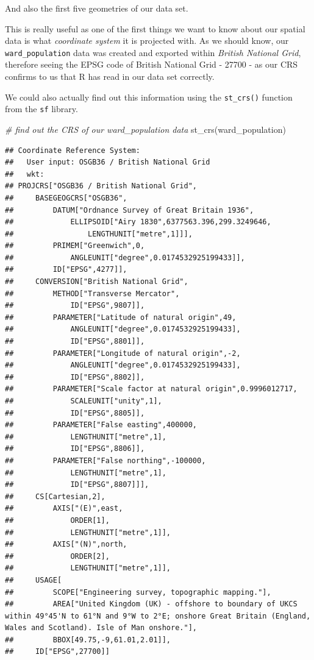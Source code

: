 \documentclass[
]{book}
\newenvironment{Shaded}{\begin{snugshade}}{\end{snugshade}}
\newcommand{\CommentTok}[1]{\textcolor[rgb]{0.56,0.35,0.01}{\textit{#1}}}
\newcommand{\FunctionTok}[1]{\textcolor[rgb]{0.00,0.00,0.00}{#1}}
\newcommand{\NormalTok}[1]{#1}
\begin{document}
And also the first five geometries of our data set.

This is really useful as one of the first things we want to know about our spatial data is what \emph{coordinate system} it is projected with. As we should know, our \texttt{ward\_population} data was created and exported within \emph{British National Grid}, therefore seeing the EPSG code of British National Grid - 27700 - as our CRS confirms to us that R has read in our data set correctly.

We could also actually find out this information using the \texttt{st\_crs()} function from the \texttt{sf} library.

\begin{Shaded}
\begin{Highlighting}[]
\CommentTok{\# find out the CRS of our ward\_population data}
\FunctionTok{st\_crs}\NormalTok{(ward\_population)}
\end{Highlighting}
\end{Shaded}

\begin{verbatim}
## Coordinate Reference System:
##   User input: OSGB36 / British National Grid 
##   wkt:
## PROJCRS["OSGB36 / British National Grid",
##     BASEGEOGCRS["OSGB36",
##         DATUM["Ordnance Survey of Great Britain 1936",
##             ELLIPSOID["Airy 1830",6377563.396,299.3249646,
##                 LENGTHUNIT["metre",1]]],
##         PRIMEM["Greenwich",0,
##             ANGLEUNIT["degree",0.0174532925199433]],
##         ID["EPSG",4277]],
##     CONVERSION["British National Grid",
##         METHOD["Transverse Mercator",
##             ID["EPSG",9807]],
##         PARAMETER["Latitude of natural origin",49,
##             ANGLEUNIT["degree",0.0174532925199433],
##             ID["EPSG",8801]],
##         PARAMETER["Longitude of natural origin",-2,
##             ANGLEUNIT["degree",0.0174532925199433],
##             ID["EPSG",8802]],
##         PARAMETER["Scale factor at natural origin",0.9996012717,
##             SCALEUNIT["unity",1],
##             ID["EPSG",8805]],
##         PARAMETER["False easting",400000,
##             LENGTHUNIT["metre",1],
##             ID["EPSG",8806]],
##         PARAMETER["False northing",-100000,
##             LENGTHUNIT["metre",1],
##             ID["EPSG",8807]]],
##     CS[Cartesian,2],
##         AXIS["(E)",east,
##             ORDER[1],
##             LENGTHUNIT["metre",1]],
##         AXIS["(N)",north,
##             ORDER[2],
##             LENGTHUNIT["metre",1]],
##     USAGE[
##         SCOPE["Engineering survey, topographic mapping."],
##         AREA["United Kingdom (UK) - offshore to boundary of UKCS within 49°45'N to 61°N and 9°W to 2°E; onshore Great Britain (England, Wales and Scotland). Isle of Man onshore."],
##         BBOX[49.75,-9,61.01,2.01]],
##     ID["EPSG",27700]]
\end{verbatim}
\end{document}
